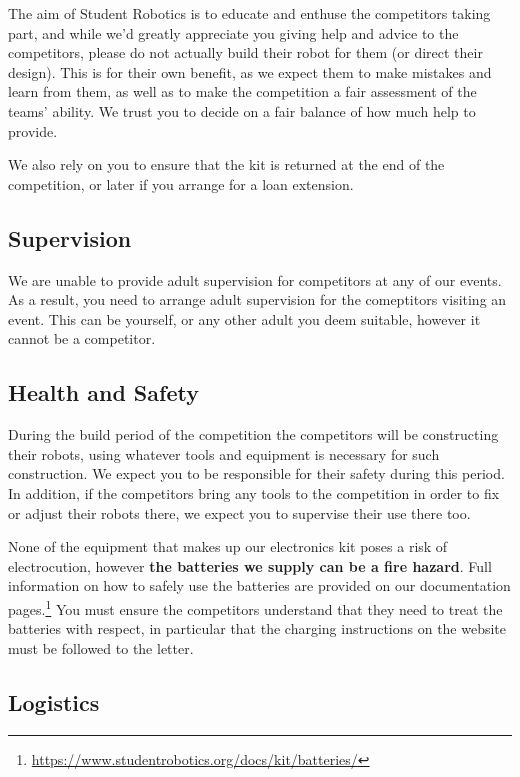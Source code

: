 \documentclass[a4paper]{article}
\begin{document}
The aim of Student Robotics is to educate and enthuse the competitors taking
part, and while we'd greatly appreciate you giving help and advice to the
competitors, please do not actually build their robot for them (or direct their
design). This is for their own benefit, as we expect them to make mistakes and
learn from them, as well as to make the competition a fair assessment of the
teams' ability. We trust you to decide on a fair balance of how much help to
provide.

We also rely on you to ensure that the kit is returned at the end of the
competition, or later if you arrange for a loan extension.

\subsection*{Supervision}

We are unable to provide adult supervision for competitors at any of our
events. As a result, you need to arrange adult supervision for the comeptitors
visiting an event. This can be yourself, or any other adult you deem suitable,
however it cannot be a competitor.

\subsection*{Health and Safety}

During the build period of the competition the competitors will be constructing
their robots, using whatever tools and equipment is necessary for such
construction. We expect you to be responsible for their safety during this
period. In addition, if the competitors bring any tools to the competition in
order to fix or adjust their robots there, we expect you to supervise their use
there too.

None of the equipment that makes up our electronics kit poses a risk of
electrocution, however \textbf{the batteries we supply can be a fire hazard}.
Full information on how to safely use the batteries are provided on our
documentation
pages.\footnote{\url{https://www.studentrobotics.org/docs/kit/batteries/}}
You must ensure the competitors understand that they need to treat the
batteries with respect, in particular that the charging instructions on
the website must be followed to the letter.

\subsection*{Logistics}
\end{document}
